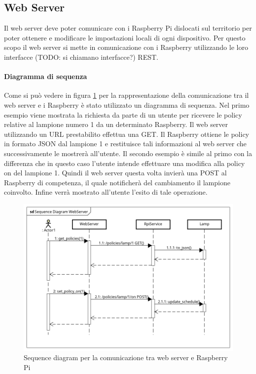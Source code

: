 \newpage
\subsection{Web Server}
Il web server deve poter comunicare con i Raspberry Pi dislocati sul territorio per poter ottenere e modificare le impostazioni locali di ogni dispositivo.
Per questo scopo il web server si mette in comunicazione con i Raspberry utilizzando le loro interfacce (TODO: si chiamano interfacce?) REST.
\paragraph{Diagramma di sequenza}
Come si può vedere in figura \ref{SD WEB} per la rappresentazione della comunicazione tra il web server e i Raspberry è stato utilizzato un diagramma di sequenza.
Nel primo esempio viene mostrata la richiesta da parte di un utente per ricevere le policy relative al lampione numero 1 da un determinato Raspberry.
Il web server utilizzando un URL prestabilito effettua una GET.
Il Raspberry ottiene le policy in formato JSON dal lampione 1 e restituisce tali informazioni al web server che successivamente le mostrerà all'utente.
Il secondo esempio è simile al primo con la differenza che in questo caso l'utente intende effettuare una modifica alla policy on del lampione 1.
Quindi il web server questa volta invierà una POST al Raspberry di competenza, il quale notificherà del cambiamento il lampione coinvolto.
Infine verrà mostrato all'utente l'esito di tale operazione.
\begin{figure}[tbp]
	\centering
	\includegraphics[scale=.55]{figure/Sequence_Diagram_WebServer.png}
	\caption{Sequence diagram per la comunicazione tra web server e Raspberry Pi \label{SD WEB}}
\end{figure}

